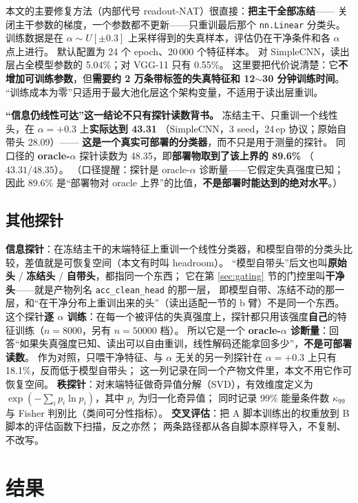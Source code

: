 \documentclass[11pt,a4paper]{ctexart}
\begin{document}
本文的主要修复方法（内部代号 readout-NAT）很直接：\textbf{把主干全部冻结}——
关闭主干参数的梯度，一个参数都不更新——只重训最后那个 \texttt{nn.Linear} 分类头。
训练数据是在 $\alpha\sim U[\pm0.3]$ 上采样得到的失真样本，评估仍在干净条件和各 $\alpha$ 点上进行。
默认配置为 24 个 epoch、20\,000 个特征样本。
对 SimpleCNN，读出层占全模型参数的 5.04\%；对 VGG-11 只有 0.55\%。
这里要把代价说清楚：它\textbf{不增加可训练参数}，但\textbf{需要约 2 万条带标签的失真特征和 12$\sim$30 分钟训练时间}。
“训练成本为零”只适用于最大池化层这个架构变量，不适用于读出层重训。

\textbf{“信息仍线性可达”这一结论不只有探针读数背书。}
冻结主干、只重训一个线性头，在 $\alpha=+0.3$ 上\textbf{实际达到 43.31}
（SimpleCNN，3 seed，24\,ep 协议；原始自带头 28.09）——
\textbf{这是一个真实可部署的分类器}，而不只是用于测量的探针。
同口径的 \textbf{oracle-$\alpha$} 探针读数为 48.35，即\textbf{部署物取到了该上界的 89.6\%}
（$43.31/48.35$）。
（口径提醒：探针是 oracle-$\alpha$ 诊断量——它假定失真强度已知；
因此 89.6\% 是“部署物对 oracle 上界”的比值，\textbf{不是部署时能达到的绝对水平}。）

\subsection{其他探针}

\textbf{信息探针}：在冻结主干的末端特征上重训一个线性分类器，和模型自带的分类头比较，差值就是可恢复空间（本文有时叫 headroom）。
“模型自带头”后文也叫\textbf{原始头} / \textbf{冻结头} / \textbf{自带头}，都指同一个东西；
它在第 \ref{sec:gating} 节的门控里叫\textbf{干净头}——就是产物列名 \texttt{acc\_clean\_head} 的那一层，
即模型自带、冻结不动的那一层，和“在干净分布上重训出来的头”（读出适配一节的 b 臂）不是同一个东西。
这个探针\textbf{逐 $\alpha$ 训练}：在每一个被评估的失真强度上，探针都只用该强度\textbf{自己}的特征训练（$n=8000$，另有 $n=50000$ 档）。
所以它是一个 \textbf{oracle-$\alpha$ 诊断量}：回答“如果失真强度已知、读出可以自由重训，线性解码还能拿回多少”，\textbf{不是可部署读数}。
作为对照，只喂干净特征、与 $\alpha$ 无关的另一列探针在 $\alpha=+0.3$ 上只有 18.1\%，反而低于模型自带头；
这一列记录在同一个产物文件里，本文不用它作可恢复空间。
\textbf{秩探针}：对末端特征做奇异值分解（SVD），有效维度定义为
$\exp(-\sum_i p_i \ln p_i)$，其中 $p_i$ 为归一化奇异值；
同时记录 99\% 能量条件数 $\kappa_{99}$ 与 Fisher 判别比（类间可分性指标）。
\textbf{交叉评估}：把 A 脚本训练出的权重放到 B 脚本的评估函数下扫描，反之亦然；
两条路径都从各自脚本原样导入，不复制、不改写。

\section{结果}
\label{sec:results}
\end{document}
